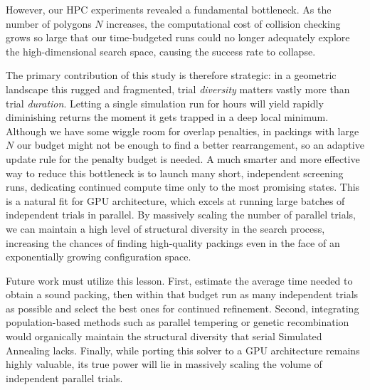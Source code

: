 \documentclass[10pt]{article}
\begin{document}
However, our HPC experiments revealed a fundamental bottleneck. As the
number of polygons $N$ increases, the computational cost of collision
checking grows so large that our time-budgeted runs could no longer
adequately explore the high-dimensional search space, causing the
success rate to collapse.

The primary contribution of this study is therefore strategic: in a
geometric landscape this rugged and fragmented, trial \emph{diversity}
matters vastly more than trial \emph{duration}. Letting a single
simulation run for hours will yield rapidly diminishing returns the moment
it gets trapped in a deep local minimum. Although we have some wiggle room
for overlap penalties, in packings with large $N$ our budget might not be enough
to find a better rearrangement, so an adaptive update rule for the penalty budget is needed.
A much smarter and more effective way to reduce this bottleneck is to launch many short,
 independent screening runs, dedicating continued compute time only 
 to the most promising states. This is a natural fit for GPU architecture,
  which excels at running large batches of independent trials in parallel.
   By massively scaling the number of parallel trials, we can maintain a high
    level of structural diversity in the search process, increasing the chances
     of finding high-quality packings even in the face of an exponentially growing
      configuration space.




Future work must utilize this lesson. First, estimate the average
time needed to obtain a sound packing, then within that budget run as many
independent trials as possible and select the best ones
for continued refinement. Second, integrating
population-based methods such as parallel tempering or genetic
recombination would organically maintain the structural diversity
that serial Simulated Annealing lacks. Finally, while porting this
solver to a GPU architecture remains highly valuable, its true power
will lie in massively scaling the  volume of independent parallel
trials.
\end{document}
